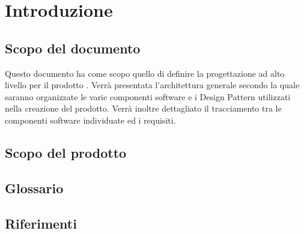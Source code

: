 %


\section{Introduzione} %
\label{sec:introduzione}

	\subsection{Scopo del documento} %
	\label{sub:scopo_del_documento}
	Questo documento ha come scopo quello di definire la progettazione ad alto livello per il prodotto \projectName. Verrà presentata l’architettura generale secondo la quale saranno organizzate le varie componenti software e i Design Pattern utilizzati nella creazione del prodotto. Verrà inoltre dettagliato il tracciamento tra le componenti software individuate ed i requisiti.

	\subsection{Scopo del prodotto} %
	\label{sub:scopo_del_prodotto}
	\productScope

	\subsection{Glossario} %
	\label{sub:glossario}
	\glossarioDesc

	\subsection{Riferimenti} %
	\label{sub:riferimenti}
